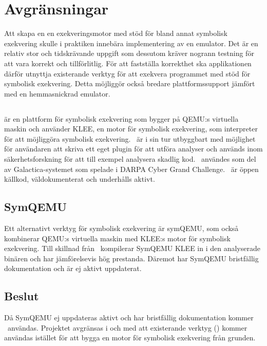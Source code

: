 \section{Avgränsningar}

Att skapa en en exekveringsmotor med stöd för bland annat symbolisk exekvering
skulle i praktiken innebära implementering av en emulator. Det är en relativ
stor och tidskrävande uppgift som dessutom kräver nogrann testning för att vara
korrekt och tillförlitlig. För att fastställa korrekthet ska applikationen
därför utnyttja existerande verktyg för att exekvera programmet med stöd för
symbolisk exekvering. Detta möjliggör också bredare plattformssupport jämfört
med en hemmasnickrad emulator.


\subsection{\stoe}

\stoe\cite{s2e} är en plattform för symbolisk exekvering som bygger på QEMU:s
virtuella maskin och använder KLEE\cite{klee}, en motor för symbolisk
exekvering, som interpreter för att möjliggöra symbolisk exekvering. \stoe\ är i
sin tur utbyggbart med möjlighet för användaren att skriva ett eget plugin för
att utföra analyser och används inom säkerhetsforskning för att till exempel
analysera skadlig kod. \stoe\ användes som del av Galactica-systemet som spelade
i DARPA Cyber Grand Challenge\cite{s2e_website}. \stoe\ är öppen källkod,
väldokumenterat och underhålls aktivt.

\subsection{SymQEMU}

Ett alternativt verktyg för symbolisk exekvering är symQEMU\cite{symqemu},
som också kombinerar QEMU:s virtuella maskin med KLEE:s motor för symbolisk
exekvering. Till skillnad från \stoe\ kompilerar SymQEMU KLEE in i den
analyserade binären och har jämförelsevis hög prestanda. Däremot har SymQEMU
bristfällig dokumentation och är ej aktivt uppdaterat.

\subsection{Beslut}

Då SymQEMU ej uppdateras aktivt och har bristfällig dokumentation kommer \stoe\
användas. Projektet avgränsas i och med att existerande verktyg (\stoe) kommer
användas istället för att bygga en motor för symbolisk exekvering från grunden.

